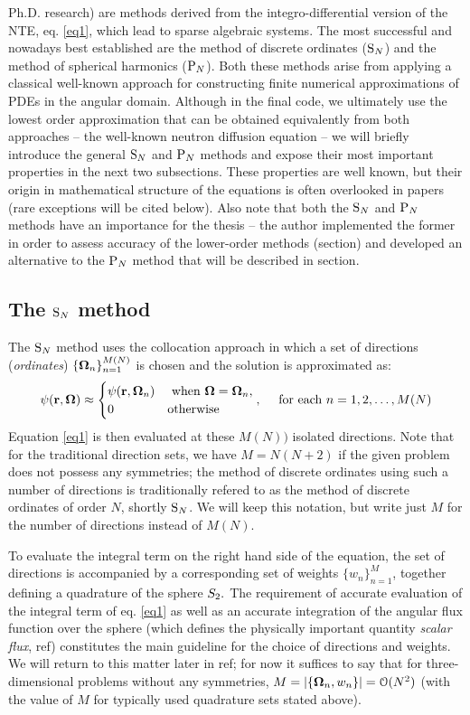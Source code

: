 Ph.D. research) are methods derived from the integro-differential
version of the NTE, eq.
\eqref{eq1}, which lead to sparse algebraic systems. The most successful and nowadays best established are the method
of discrete ordinates ($\text{S}_{N}$) and the method of spherical harmonics ($\text{P}_{N}$).
Both these methods arise from applying a classical well-known approach for constructing finite numerical
approximations of PDEs  in the
angular domain. Although in the final code, we ultimately use the lowest order approximation that can be obtained
equivalently from both approaches -- the well-known neutron diffusion equation -- we will briefly introduce the general
$\text{S}_{N}$ and $\text{P}_{N}$ methods and expose their most important properties in the next two subsections. These properties are
well known, but their origin in mathematical structure of the equations is often overlooked in papers (rare
exceptions will be cited below). Also note that both the $\text{S}_{N}$ and $\text{P}_{N}$ methods have an importance for the thesis -- 
the author implemented the former in order to assess accuracy of the lower-order methods (\alert{section}) and developed
an alternative to the $\text{P}_{N}$ method that will be described in \alert{section}.

\subsection{The $\text{S}_{N}$ method}\label{sec:1-SN}
The $\text{S}_{N}$ method uses the collocation approach in which a set of directions (\textit{ordinates})
$\{\mathbf{\Omega}_n\}_{n=1}^{M(N)}$ is chosen and the solution is approximated as:
\begin{equation}\label{eq:sn_approx} 
	\psi(\mathbf{r}, \mathbf{\Omega}) \approx \begin{cases}\displaystyle \psi(\mathbf{r},\mathbf{\Omega}_n) & \mbox{ when $\mathbf{\Omega} = \mathbf{\Omega}_n$},\\ 0 & \mbox{otherwise} \end{cases},\quad
	\text{ for each } n = 1,2,\ldots,M(N) 
\end{equation}
Equation \eqref{eq1} is then evaluated at these $M(N))$ isolated directions. Note
that for the traditional direction sets, we have $M = N(N+2)$ if the given problem does not possess any symmetries; the
method of discrete ordinates using such a number of directions is traditionally refered to as the method of discrete
ordinates of order $N$, shortly $\text{S}_{N}$. We will keep this notation, but  write just $M$ for the number of directions
instead of $M(N)$.

To evaluate the integral term on the right hand side of the equation, the set of directions is accompanied by a
corresponding set of weights $\{w_n\}_{n=1}^M$, together defining a quadrature of the sphere $S_2.$ The requirement
of accurate evaluation of the integral term of eq.
\eqref{eq1} as well as an accurate integration of the angular flux function over the sphere (which defines the
physically important quantity \textit{scalar flux}, \alert{ref}) constitutes the main guideline for the choice of
directions and weights. We will return to this matter later in \alert{ref}; for now it suffices to say that for
three-dimensional problems without any symmetries, \mbox{$M = \left|\{\mathbf{\Omega}_n, w_n\}\right| = \mathcal{O}(N^2)$} (with the
value of $M$ for typically used quadrature sets stated above).

